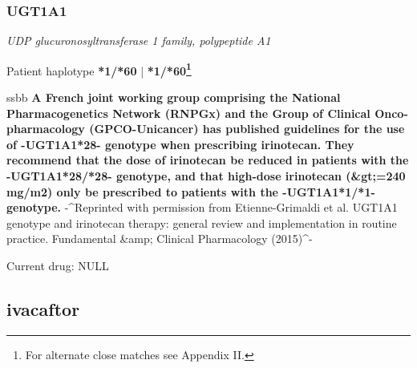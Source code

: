 \documentclass{book}
\begin{document}
        \subsubsection{ UGT1A1 }
      \textit{ UDP glucuronosyltransferase 1 family, polypeptide A1 }
      \begin{center}
      Patient haplotype
      \textbf{ *1/*60 } | \textbf{ *1/*60\footnote{For alternate close matches see Appendix II.} } \newline\newline
      \scriptsize
      \begin{tabularx}{\textwidth}{ssbb}
      \textbf{ A French joint working group comprising the National Pharmacogenetics Network (RNPGx) and the Group of Clinical Onco-pharmacology (GPCO-Unicancer) has published guidelines for the use of -UGT1A1*28- genotype when prescribing irinotecan. They recommend that the dose of irinotecan be reduced in patients with the -UGT1A1*28/*28- genotype, and that high-dose irinotecan (&gt;=240 mg/m2) only be prescribed to patients with the -UGT1A1*1/*1- genotype. }
      -^Reprinted with permission from Etienne-Grimaldi et al. UGT1A1 genotype and irinotecan therapy: general review and implementation in routine practice. Fundamental &amp; Clinical Pharmacology (2015)^-\\
      \end{tabularx}
      \end{center}

      

    

      Current drug: NULL

      \subsection{ ivacaftor }
\end{document}
